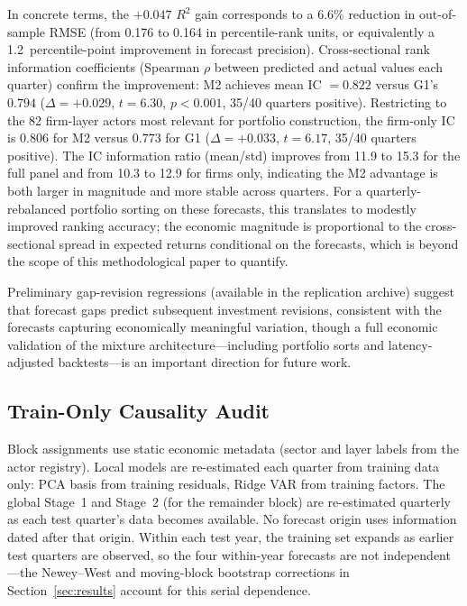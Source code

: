 \documentclass[11pt,a4paper]{article}
\begin{document}
In concrete terms, the $+0.047$ $R^2$ gain corresponds to a 6.6\% reduction in out-of-sample RMSE (from 0.176 to 0.164 in percentile-rank units, or equivalently a 1.2~percentile-point improvement in forecast precision). Cross-sectional rank information coefficients (Spearman $\rho$ between predicted and actual values each quarter) confirm the improvement: M2 achieves mean IC $= 0.822$ versus G1's $0.794$ ($\Delta = +0.029$, $t = 6.30$, $p < 0.001$, 35/40 quarters positive). Restricting to the 82 firm-layer actors most relevant for portfolio construction, the firm-only IC is $0.806$ for M2 versus $0.773$ for G1 ($\Delta = +0.033$, $t = 6.17$, 35/40 quarters positive). The IC information ratio (mean/std) improves from 11.9 to 15.3 for the full panel and from 10.3 to 12.9 for firms only, indicating the M2 advantage is both larger in magnitude and more stable across quarters. For a quarterly-rebalanced portfolio sorting on these forecasts, this translates to modestly improved ranking accuracy; the economic magnitude is proportional to the cross-sectional spread in expected returns conditional on the forecasts, which is beyond the scope of this methodological paper to quantify.

Preliminary gap-revision regressions (available in the replication archive) suggest that forecast gaps predict subsequent investment revisions, consistent with the forecasts capturing economically meaningful variation, though a full economic validation of the mixture architecture---including portfolio sorts and latency-adjusted backtests---is an important direction for future work.

\subsection{Train-Only Causality Audit}

Block assignments use static economic metadata (sector and layer labels from the actor registry). Local models are re-estimated each quarter from training data only: PCA basis from training residuals, Ridge VAR from training factors. The global Stage~1 and Stage~2 (for the remainder block) are re-estimated quarterly as each test quarter's data becomes available. No forecast origin uses information dated after that origin. Within each test year, the training set expands as earlier test quarters are observed, so the four within-year forecasts are not independent---the Newey--West and moving-block bootstrap corrections in Section~\ref{sec:results} account for this serial dependence.
\end{document}
